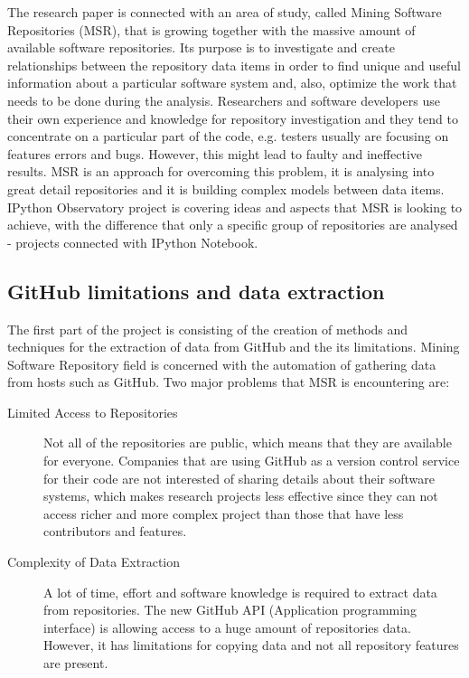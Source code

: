 The research paper is connected with an area of study, called Mining Software Repositories (MSR)\cite{MSR2016}, that is growing together with the massive amount of available software repositories. Its purpose is to investigate and create relationships between the repository data items in order to find unique and useful information about a particular software system and, also, optimize the work that needs to be done during the analysis. Researchers and software developers use their own experience and knowledge for repository investigation and they tend to concentrate on a particular part of the code, e.g. testers usually are focusing on features errors and bugs. However, this might lead to faulty and ineffective results. MSR is an approach for overcoming this problem, it is analysing into great detail repositories and it is building complex models between data items\cite{hassan2008road}. IPython Observatory project is covering ideas and aspects that MSR is looking to achieve, with the difference that only a specific group of repositories are analysed - projects connected with IPython Notebook.

\subsection{GitHub limitations and data extraction}
\label{subsec:limitations}
The first part of the project is consisting of the creation of methods and techniques for the extraction of data from GitHub\cite{gitHubWiki} and the its limitations. Mining Software Repository field is concerned with the automation of gathering data from hosts such as GitHub. Two major problems that MSR is encountering are\cite{hassan2008road}:

\vspace{1em}
\begin{description}
    \item[Limited Access to Repositories]  Not all of the repositories are public, which means that they are available for everyone. Companies that are using GitHub as a version control service for their code are not interested of sharing details about their software systems, which makes research projects less effective since they can not access richer and more complex project than those that have less contributors and features\cite{hassan2008road}. 
    
    \item[Complexity of Data Extraction] A lot of time, effort and software knowledge is required to extract data from repositories. The new GitHub API (Application programming interface)\cite{GitAPI} is allowing access to a huge amount of repositories data. However, it has limitations for copying data and not all repository features are present. 
\end{description}
\vspace{1em}

